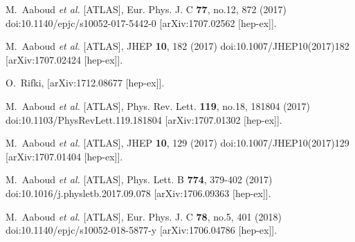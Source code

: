 \begin{thebibliography}{9}
M.~Aaboud \textit{et al.} [ATLAS],
Eur. Phys. J. C \textbf{77}, no.12, 872 (2017)
doi:10.1140/epjc/s10052-017-5442-0
[arXiv:1707.02562 [hep-ex]].

M.~Aaboud \textit{et al.} [ATLAS],
JHEP \textbf{10}, 182 (2017)
doi:10.1007/JHEP10(2017)182
[arXiv:1707.02424 [hep-ex]].

O.~Rifki,
[arXiv:1712.08677 [hep-ex]].

M.~Aaboud \textit{et al.} [ATLAS],
Phys. Rev. Lett. \textbf{119}, no.18, 181804 (2017)
doi:10.1103/PhysRevLett.119.181804
[arXiv:1707.01302 [hep-ex]].

M.~Aaboud \textit{et al.} [ATLAS],
JHEP \textbf{10}, 129 (2017)
doi:10.1007/JHEP10(2017)129
[arXiv:1707.01404 [hep-ex]].

M.~Aaboud \textit{et al.} [ATLAS],
Phys. Lett. B \textbf{774}, 379-402 (2017)
doi:10.1016/j.physletb.2017.09.078
[arXiv:1706.09363 [hep-ex]].

M.~Aaboud \textit{et al.} [ATLAS],
Eur. Phys. J. C \textbf{78}, no.5, 401 (2018)
doi:10.1140/epjc/s10052-018-5877-y
[arXiv:1706.04786 [hep-ex]].


\end{thebibliography}
